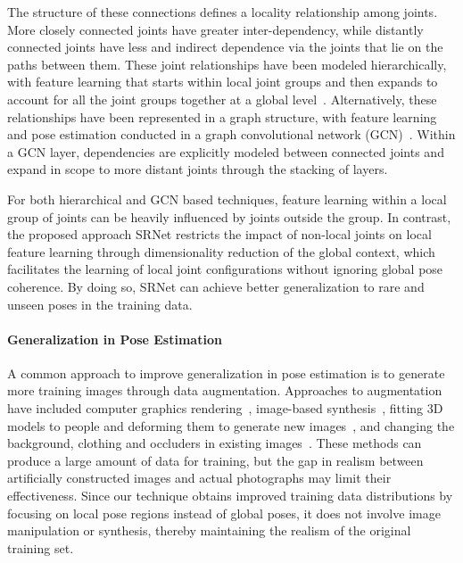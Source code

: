 \documentclass[runningheads]{llncs}
\begin{document}
The structure of these connections defines a locality relationship among joints. More closely connected joints have greater inter-dependency, while distantly connected joints have less and indirect dependence via the joints that lie on the paths between them. These joint relationships have been modeled hierarchically, with feature learning that starts within local joint groups and then expands to account for all the joint groups together at a global level~\cite{park20183d}. Alternatively, these relationships have been represented in a graph structure, with feature learning and pose estimation conducted in a graph convolutional network (GCN)~\cite{zhao2019semantic,cai2019exploiting,ci2019optimizing}. Within a GCN layer, dependencies are explicitly modeled between connected joints and expand in scope to more distant joints through the stacking of layers.

For both hierarchical and GCN based techniques, feature learning within a local group of joints can be heavily influenced by joints outside the group. In contrast, the proposed approach SRNet restricts the impact of non-local joints on local feature learning through dimensionality reduction of the global context, which facilitates the learning of local joint configurations without ignoring global pose coherence. By doing so, SRNet can achieve better generalization to rare and unseen poses in the training data.


















\paragraph{\textbf{Generalization in Pose Estimation}}

A common approach to improve generalization in pose estimation is to generate more training images through data augmentation. Approaches to augmentation have included computer graphics rendering~\cite{chen2016synthesizing,varol2017learning}, image-based synthesis~\cite{rogez2016mocap}, fitting 3D models to people and deforming them to generate new images~\cite{pishchulin2012articulated}, and changing the background, clothing and occluders in existing images~\cite{mehta2017monocular}. These methods can produce a large amount of data for training, but the gap in realism between artificially constructed images and actual photographs may limit their effectiveness. Since our technique obtains improved training data distributions by focusing on local pose regions instead of global poses, it does not involve image manipulation or synthesis, thereby maintaining the realism of the original training set.
\end{document}
